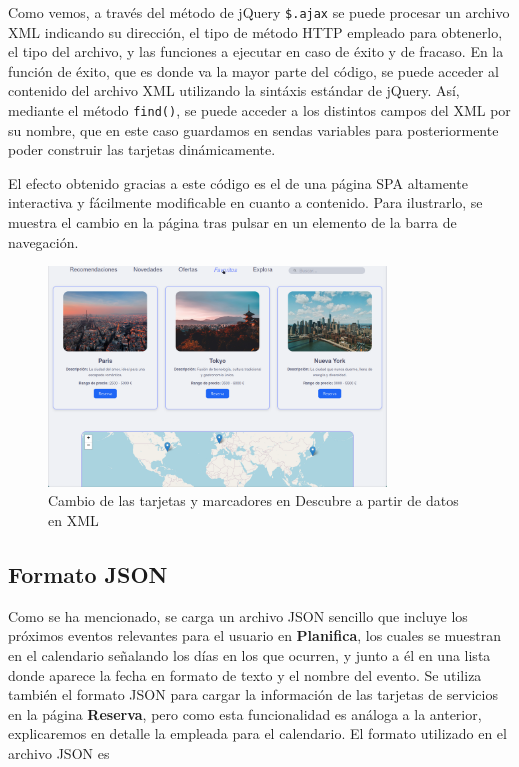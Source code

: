 \documentclass[11pt, a4paper]{book}
\begin{document}
    Como vemos, a través del método de jQuery \texttt{\$.ajax} se puede procesar un archivo XML indicando su dirección, el tipo de método HTTP empleado para obtenerlo, el tipo del archivo, y las funciones a ejecutar en caso de éxito y de fracaso. En la función de éxito, que es donde va la mayor parte del código, se puede acceder al contenido del archivo XML utilizando la sintáxis estándar de jQuery. Así, mediante el método \texttt{find()}, se puede acceder a los distintos campos del XML por su nombre, que en este caso guardamos en sendas variables para posteriormente poder construir las tarjetas dinámicamente. 

    El efecto obtenido gracias a este código es el de una página SPA altamente interactiva y fácilmente modificable en cuanto a contenido. Para ilustrarlo, se muestra el cambio en la página tras pulsar en un elemento de la barra de navegación.
    
	\begin{figure} [H]
		\centering
        \includegraphics[width=0.8\textwidth]{CSS/4 extra1.png}
		\caption{Cambio de las tarjetas y marcadores en Descubre a partir de datos en XML}
	\end{figure}

	\subsection{Formato JSON}
	Como se ha mencionado, se carga un archivo JSON sencillo que incluye los próximos eventos relevantes para el usuario en \textbf{Planifica}, los cuales se muestran en el calendario señalando los días en los que ocurren, y junto a él en una lista donde aparece la fecha en formato de texto y el nombre del evento. Se utiliza también el formato JSON para cargar la información de las tarjetas de servicios en la página \textbf{Reserva}, pero como esta funcionalidad es análoga a la anterior, explicaremos en detalle la empleada para el calendario. El formato utilizado en el archivo JSON es
	
\end{document}
